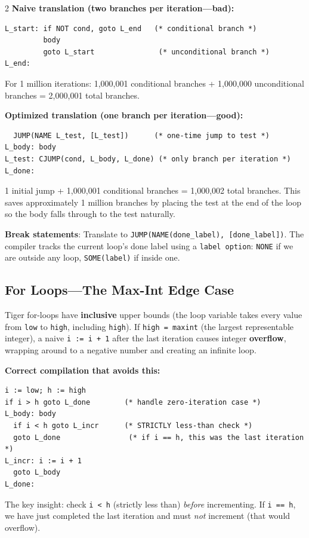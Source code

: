 \documentclass[9pt,landscape]{extarticle}
\begin{document}
\begin{multicols}{2}
\textbf{Naive translation (two branches per iteration---bad):}
\begin{lstlisting}
L_start: if NOT cond, goto L_end   (* conditional branch *)
         body
         goto L_start               (* unconditional branch *)
L_end:
\end{lstlisting}
For 1 million iterations: 1,000,001 conditional branches + 1,000,000 unconditional branches = 2,000,001 total branches.

\textbf{Optimized translation (one branch per iteration---good):}
\begin{lstlisting}
  JUMP(NAME L_test, [L_test])      (* one-time jump to test *)
L_body: body
L_test: CJUMP(cond, L_body, L_done) (* only branch per iteration *)
L_done:
\end{lstlisting}
1 initial jump + 1,000,001 conditional branches = 1,000,002 total branches. This saves approximately 1 million branches by placing the test at the end of the loop so the body falls through to the test naturally.

\textbf{Break statements}: Translate to \texttt{JUMP(NAME(done\_label), [done\_label])}. The compiler tracks the current loop's done label using a \texttt{label option}: \texttt{NONE} if we are outside any loop, \texttt{SOME(label)} if inside one.

\subsection{For Loops---The Max-Int Edge Case}

Tiger for-loops have \textbf{inclusive} upper bounds (the loop variable takes every value from \texttt{low} to \texttt{high}, including \texttt{high}). If \texttt{high = maxint} (the largest representable integer), a naive \texttt{i := i + 1} after the last iteration causes integer \textbf{overflow}, wrapping around to a negative number and creating an infinite loop.

\textbf{Correct compilation that avoids this:}
\begin{lstlisting}
i := low; h := high
if i > h goto L_done        (* handle zero-iteration case *)
L_body: body
  if i < h goto L_incr      (* STRICTLY less-than check *)
  goto L_done                (* if i == h, this was the last iteration *)
L_incr: i := i + 1
  goto L_body
L_done:
\end{lstlisting}

The key insight: check \texttt{i < h} (strictly less than) \emph{before} incrementing. If \texttt{i == h}, we have just completed the last iteration and must \emph{not} increment (that would overflow).


\end{multicols}
\end{document}
